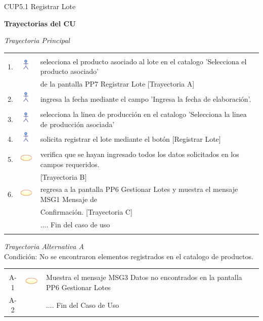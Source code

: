 \documentclass[10pt,spanish]{article}
\providecommand{\tabularnewline}{\\}
\begin{document}
\begin{table}[!ht]
	\caption{CUP5.1 Registrar Lote}
	\label{tab:CasosdeUso:nombredecasodeuso} 
	\end{table}
	\newpage
	\textbf{\large Trayectorias del CU}{\large \par}
	\textit{\large Trayectoria Principal}{\large{} }{\large \par}
	\begin{tabular}{ccl}
	 &  & \tabularnewline
	1. & \includegraphics{actor} & selecciona el producto asociado al lote en el catalogo 'Selecciona el producto asociado'\tabularnewline
	& &   de la pantalla PP7 Registrar Lote [Trayectoria A] \tabularnewline
	2. & \includegraphics{actor} & ingresa la fecha mediante el campo 'Ingresa la fecha de elaboración'.\tabularnewline
	3. & \includegraphics{actor} & selecciona la linea de producción en el catalogo 'Selecciona la linea de producción asociada' \tabularnewline
	4. & \includegraphics{actor} & solicita registrar el lote mediante el botón [Registrar Lote]\tabularnewline
	5. & \includegraphics{sistema} & verifica que se hayan ingresado todos los datos solicitados en los campos requeridos.\tabularnewline
	& & [Trayectoria B]\tabularnewline
	6. & \includegraphics{sistema} & regresa a la pantalla PP6 Gestionar Lotes y muestra el mensaje MSG1 Mensaje de \tabularnewline
	& & Confirmación. [Trayectoria C]\tabularnewline
	 &  & .... Fin del caso de uso\tabularnewline \\
	\end{tabular}		
	
	\textit{Trayectoria Alternativa A}\\
	Condición: No se encontraron elementos registrados en el catalogo de productos.\\
	\begin{tabular}{ccl}
	& & \tabularnewline
	A-1 & \includegraphics{sistema} & Muestra el mensaje MSG3 Datos no encontrados en la pantalla PP6 Gestionar Lotes\tabularnewline	
	A-2 & & .... Fin del Caso de Uso\tabularnewline
	\end{tabular}	
	
\end{document}
